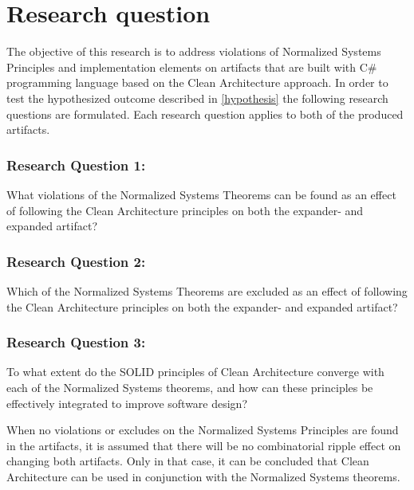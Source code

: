 \section{Research question} \label{sec:research_questions}

The objective of this research is to address violations of Normalized Systems Principles
and implementation elements on artifacts that are built with C\# programming language
based on the Clean Architecture approach. In order to test the hypothesized outcome
described in \ref{hypothesis} the following research questions are formulated. Each
research question applies to both of the produced artifacts.

\subsubsection{Research Question 1:} \label{rq1}
What violations of the Normalized Systems Theorems can be found as an effect of
following the Clean Architecture principles on both the expander- and expanded artifact?

\subsubsection{Research Question 2:} \label{rq2}
Which of the Normalized Systems Theorems are excluded as an effect of following the
Clean Architecture principles on both the expander- and expanded artifact?

\subsubsection{Research Question 3:} \label{rq3}
To what extent do the SOLID principles of Clean Architecture converge with each of the
Normalized Systems theorems, and how can these principles be effectively integrated to
improve software design?

When no violations or excludes on the Normalized Systems Principles are found in the
artifacts, it is assumed that there will be no combinatorial ripple effect on changing
both artifacts. Only in that case, it can be concluded that Clean Architecture can be
used in conjunction with the Normalized Systems theorems. 